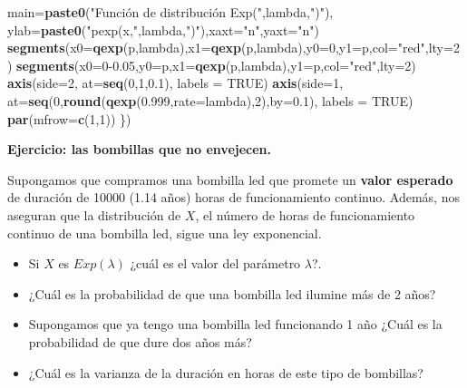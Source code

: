 \documentclass[]{book}
\newenvironment{Shaded}{\begin{snugshade}}{\end{snugshade}}
\newcommand{\DataTypeTok}[1]{\textcolor[rgb]{0.13,0.29,0.53}{#1}}
\newcommand{\DecValTok}[1]{\textcolor[rgb]{0.00,0.00,0.81}{#1}}
\newcommand{\FloatTok}[1]{\textcolor[rgb]{0.00,0.00,0.81}{#1}}
\newcommand{\KeywordTok}[1]{\textcolor[rgb]{0.13,0.29,0.53}{\textbf{#1}}}
\newcommand{\NormalTok}[1]{#1}
\newcommand{\OtherTok}[1]{\textcolor[rgb]{0.56,0.35,0.01}{#1}}
\newcommand{\StringTok}[1]{\textcolor[rgb]{0.31,0.60,0.02}{#1}}
\providecommand{\tightlist}{%
  \setlength{\itemsep}{0pt}\setlength{\parskip}{0pt}}
\begin{document}
\begin{Shaded}
\begin{Highlighting}[]
        \DataTypeTok{main=}\KeywordTok{paste0}\NormalTok{(}\StringTok{"Función de distribución Exp("}\NormalTok{,lambda,}\StringTok{")"}\NormalTok{),}
        \DataTypeTok{ylab=}\KeywordTok{paste0}\NormalTok{(}\StringTok{"pexp(x,"}\NormalTok{,lambda,}\StringTok{")"}\NormalTok{),}\DataTypeTok{xaxt=}\StringTok{"n"}\NormalTok{,}\DataTypeTok{yaxt=}\StringTok{"n"}\NormalTok{)}
  \KeywordTok{segments}\NormalTok{(}\DataTypeTok{x0=}\KeywordTok{qexp}\NormalTok{(p,lambda),}\DataTypeTok{x1=}\KeywordTok{qexp}\NormalTok{(p,lambda),}\DataTypeTok{y0=}\DecValTok{0}\NormalTok{,}\DataTypeTok{y1=}\NormalTok{p,}\DataTypeTok{col=}\StringTok{"red"}\NormalTok{,}\DataTypeTok{lty=}\DecValTok{2}\NormalTok{)}
  \KeywordTok{segments}\NormalTok{(}\DataTypeTok{x0=}\DecValTok{0}\FloatTok{-0.05}\NormalTok{,}\DataTypeTok{y0=}\NormalTok{p,}\DataTypeTok{x1=}\KeywordTok{qexp}\NormalTok{(p,lambda),}\DataTypeTok{y1=}\NormalTok{p,}\DataTypeTok{col=}\StringTok{"red"}\NormalTok{,}\DataTypeTok{lty=}\DecValTok{2}\NormalTok{)}
  \KeywordTok{axis}\NormalTok{(}\DataTypeTok{side=}\DecValTok{2}\NormalTok{, }\DataTypeTok{at=}\KeywordTok{seq}\NormalTok{(}\DecValTok{0}\NormalTok{,}\DecValTok{1}\NormalTok{,}\FloatTok{0.1}\NormalTok{), }\DataTypeTok{labels =} \OtherTok{TRUE}\NormalTok{)}
  \KeywordTok{axis}\NormalTok{(}\DataTypeTok{side=}\DecValTok{1}\NormalTok{, }\DataTypeTok{at=}\KeywordTok{seq}\NormalTok{(}\DecValTok{0}\NormalTok{,}\KeywordTok{round}\NormalTok{(}\KeywordTok{qexp}\NormalTok{(}\FloatTok{0.999}\NormalTok{,}\DataTypeTok{rate=}\NormalTok{lambda),}\DecValTok{2}\NormalTok{),}\DataTypeTok{by=}\FloatTok{0.1}\NormalTok{), }\DataTypeTok{labels =} \OtherTok{TRUE}\NormalTok{)}
  \KeywordTok{par}\NormalTok{(}\DataTypeTok{mfrow=}\KeywordTok{c}\NormalTok{(}\DecValTok{1}\NormalTok{,}\DecValTok{1}\NormalTok{))}
\NormalTok{\})}
\end{Highlighting}
\end{Shaded}

\textbf{Ejercicio: las bombillas que no envejecen.}

Supongamos que compramos una bombilla led que promete un \textbf{valor esperado} de duración de 10000 (1.14 años) horas de funcionamiento continuo. Además, nos aseguran que la distribución de \(X\), el número de horas de funcionamiento continuo de una bombilla led, sigue una ley exponencial.

\begin{itemize}
\tightlist
\item
  Si \(X\) es \(Exp(\lambda)\) ¿cuál es el valor del parámetro \(\lambda\)?.
\item
  ¿Cuál es la probabilidad de que una bombilla led ilumine más de 2 años?
\item
  Supongamos que ya tengo una bombilla led funcionando 1 año ¿Cuál es la probabilidad de que dure dos años más?
\item
  ¿Cuál es la varianza de la duración en horas de este tipo de bombillas?
\end{itemize}
\end{document}
